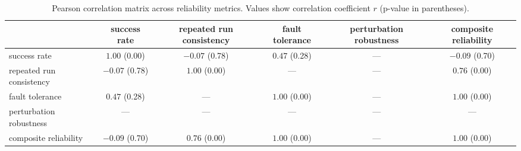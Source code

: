 \begin{table}[t]
\centering
\caption{Pearson correlation matrix across reliability metrics. Values show correlation coefficient $r$ (p-value in parentheses).}
\label{tab:metric_correlation}
\begin{tabular}{lccccc}
\toprule
 & success rate & repeated run consistency & fault tolerance & perturbation robustness & composite reliability \\
\midrule
success rate & $1.00$ (0.00) & $-0.07$ (0.78) & $0.47$ (0.28) & --- & $-0.09$ (0.70) \\
repeated run consistency & $-0.07$ (0.78) & $1.00$ (0.00) & --- & --- & $0.76$ (0.00) \\
fault tolerance & $0.47$ (0.28) & --- & $1.00$ (0.00) & --- & $1.00$ (0.00) \\
perturbation robustness & --- & --- & --- & --- & --- \\
composite reliability & $-0.09$ (0.70) & $0.76$ (0.00) & $1.00$ (0.00) & --- & $1.00$ (0.00) \\
\bottomrule
\end{tabular}
\end{table}
